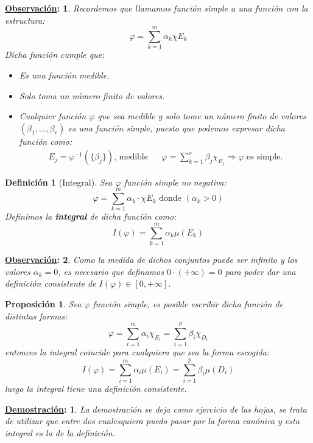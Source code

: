 \documentclass[10pt,a4paper,openright]{book}
\theoremstyle{break}
\newtheorem*{defi}{Definición}
\newtheorem*{prop}{Proposición}
\newtheorem*{demo}{\underline{Demostración}:}
\newtheorem*{obs}{\underline{Observación}:}
\begin{document}
\begin{obs}
Recordemos que llamamos función simple a una función con la estructura:
$$\varphi = \sum_{k=1}^{m} \alpha_k\chi{E_k}$$
Dicha función cumple que:
\begin{itemize}
    \item Es una función medible.
    \item Solo toma un número finito de valores.
    \item Cualquier función $\varphi$ que sea medible y solo tome un número finito de valores $(\beta_1, \ldots, \beta_r)$ es una función simple, puesto que podemos expresar dicha función como:
\begin{align*}
E_j = \varphi^{-1}\left(\{\beta_j\}\right) \text{, medible} & & \varphi = \sum_{k=1}^{r} \beta_j \chi_{E_j} \Rightarrow \varphi \text{ es simple.}
\end{align*}
\end{itemize}
\end{obs}

\begin{defi}[Integral]
Sea $\varphi$ función simple no negativa:
$$\varphi = \sum_{k=1}^{m} \alpha_k \cdot \chi{E_k} \mbox{ donde } \left(\alpha_k > 0\right)$$
Definimos la \textbf{integral} de dicha función como:
$$I\left(\varphi\right) = \sum_{k=1}^{m} \alpha_k \mu\left(E_k\right)$$
\end{defi}

\begin{obs}
Como la medida de dichos conjuntos puede ser infinito y los valores $\alpha_k = 0$, es necesario que definamos $0 \cdot \left(+ \infty\right) = 0$ para poder dar una definición consistente de $I\left(\varphi\right) \in \left[0, +\infty\right]$.
\end{obs}


\begin{prop}
Sea $\varphi$ función simple, es posible escribir dicha función de distintas formas:
$$\varphi = \sum_{i=1}^{m} \alpha_i \chi_{E_i} = \sum_{i=1}^{p} \beta_i \chi_{D_i}$$
entonces la integral coincide para cualquiera que sea la forma escogida:
$$I(\varphi) = \sum_{i=1}^{m} \alpha_i \mu\left(E_i\right) = \sum_{i=1}^{p} \beta_i \mu\left(D_i\right)$$
luego la integral tiene una definición consistente.
\end{prop}
\begin{demo}
La demostración se deja como ejercicio de las hojas, se trata de utilizar que entre dos cualesquiera puedo pasar por la forma canónica y esta integral es la de la definición.
\end{demo}
\end{document}
